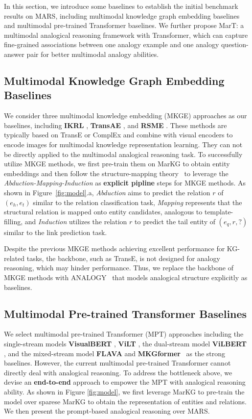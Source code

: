 \documentclass{article} \usepackage{iclr2023_conference,times}
\newcommand{\ours}{MarT}
\newcommand{\data}{MARS}
\newcommand{\kg}{MarKG}
\begin{document}
In this section, we introduce some baselines to establish the initial benchmark results on {\data}, including multimodal knowledge graph embedding baselines and multimodal pre-trained Transformer baselines. 
We further propose {\ours}: a multimodal analogical reasoning framework with Transformer, which can capture fine-grained associations between one analogy example and one analogy question-answer pair for better multimodal analogy abilities.


\subsection{Multimodal Knowledge Graph Embedding Baselines}

We consider three multimodal knowledge embedding (MKGE) approaches as our baselines, including \textbf{IKRL} \citep{IKRL}, \textbf{TransAE} \citep{TransAE},  and \textbf{RSME} \citep{RSME}.  
These methods are typically based on TransE \citep{TransE} or ComplEx \citep{complex} and combine with visual encoders to encode images for multimodal knowledge representation learning.
They can not be directly applied to the multimodal analogical reasoning task.
To successfully utilize MKGE methods, we first pre-train them on {\kg} to obtain entity embeddings and then follow the structure-mapping theory~\citep{minnameier2010abduction} to leverage the \textit{Abduction-Mapping-Induction} as \textbf{explicit
pipline} steps for MKGE methods.
As shown in Figure~\ref{fig:model}.a, \textit{Abduction} aims to predict the relation $r$ of $(e_h, e_t)$ similar to the relation classification task, \textit{Mapping} represents that the structural relation is mapped onto entity candidates, analogous to template-filling, and \textit{Induction} utilizes the relation $r$ to predict the tail entity of $(e_q, r, ?)$ similar to the link prediction task.

Despite the previous MKGE methods achieving excellent performance for KG-related tasks, the backbone, such as TransE, is not designed for analogy reasoning, which may hinder performance. 
Thus, we replace the backbone of MKGE methods with ANALOGY~\cite{icml_analogy} that models analogical structure explicitly as baselines.
 

\subsection{Multimodal Pre-trained Transformer Baselines}
We select multimodal pre-trained Transformer (MPT) approaches including the single-stream models \textbf{VisualBERT} \citep{VisualBERT}, \textbf{ViLT} \citep{ViLT}, the dual-stream model \textbf{ViLBERT} \citep{ViLBERT}, and the mixed-stream model \textbf{FLAVA} \citep{FLAVA} and \textbf{MKGformer}~\cite{MKGformer} as the strong baselines.
However, the current multimodal pre-trained Transformer cannot directly deal with analogical reasoning.
To address the bottleneck above, we devise an \textbf{end-to-end} approach to empower the MPT with analogical reasoning ability.
As shown in Figure \ref{fig:model}, we first leverage {\kg} to pre-train the model over sparese {\kg} to obtain the representation of entities and relations. 
We then present the prompt-based analogical reasoning over {\data}.
\end{document}
